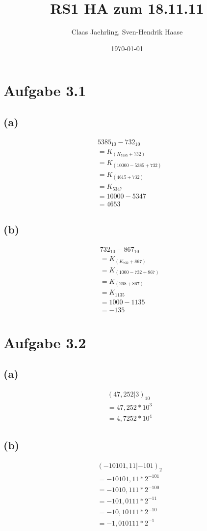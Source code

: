\documentclass[12pt]{article}
\author{Claas Jaehrling, Sven-Hendrik Haase}
\title{RS1 HA zum 18.11.11}
\date{\today}
\begin{document}
\maketitle

\section{Aufgabe 3.1}

\subsection{(a)}
\begin{align}
&5385_{10} - 732_{10}\\
&= K_{(K_5385 + 732)}\\
&= K_{(10000-5385 + 732)}\\
&= K_{(4615 + 732)}\\
&= K_{5347}\\
&= 10000-5347\\
&= 4653
\end{align}

\subsection{(b)}
\begin{align}
&732_{10} - 867_{10}\\
&= K_{(K_{732} + 867)}\\
&= K_{(1000-732 + 867)}\\
&= K_{(268 + 867)}\\
&= K_{1135}\\
&= 1000 -1135\\
&= -135
\end{align}

\section{Aufgabe 3.2}

\subsection{(a)}
\begin{align}
&(47,252|3)_{10}\\
&= 47,252 * 10^3\\
&= 4,7252 * 10^4
\end{align}

\subsection{(b)}
\begin{align}
&(-10101,11|-101)_2\\
&= -10101,11 * 2^{-101}\\
&= -1010,111 * 2^{-100}\\
&= -101,0111 * 2^{-11}\\
&= -10,10111 * 2^{-10}\\
&= -1,010111 * 2^{-1}
\end{align}
\end{document}
